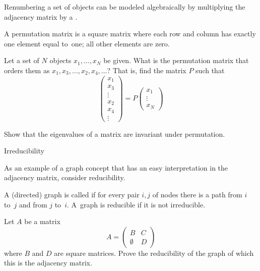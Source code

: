 Renumbering a set of objects can be modeled algebraically by
multiplying the adjacency matrix by a .
\begin{definition}
A permutation matrix is a square matrix where each row and column
has exactly one element equal to~one; all other elements are zero.
\end{definition}

\begin{exercise}
Let a set of $N$ objects $x_1,\ldots,x_N$ be given. What is the 
permutation matrix that orders them as $x_1,x_3,\ldots,x_2,x_4,\ldots$?
That is, find the matrix $P$ such that
\[
\begin{pmatrix}
x_1\\x_3\\\vdots\\x_2\\x_4\\\vdots
\end{pmatrix} = P
\begin{pmatrix}
x_1\\\vdots\\x_N
\end{pmatrix}
\]
\end{exercise}

\begin{exercise}
Show that the eigenvalues of a matrix are invariant under permutation.
\end{exercise}

 {Irreducibility}

As an example of a graph concept that has an easy interpretation in the
adjacency matrix, consider reducibility.

\begin{definition}
A (directed) graph is called  if for every pair $i,j$ of
nodes there is a path from $i$ to~$j$ and from $j$ to~$i$. A~graph is
reducible if it is not irreducible.
\end{definition}

\begin{exercise}
  Let $A$ be a matrix
  \begin{equation}
    A=
    \begin{pmatrix}
      B&C\\ \emptyset&D
    \end{pmatrix}
    \label{eq:reduct-u}
  \end{equation}
  where $B$ and $D$ are square matrices. Prove the reducibility of the
  graph of which this is the adjacency matrix.
\end{exercise}

